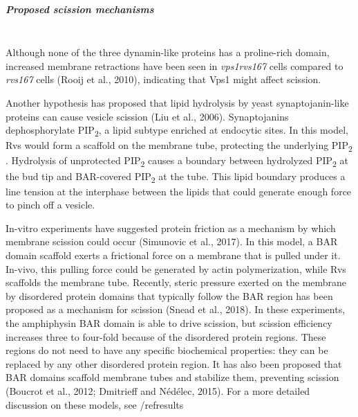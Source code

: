 
		
			\subparagraph{Proposed scission mechanisms}
			\mbox{}\\
			Although none of the three dynamin-like proteins has a proline-rich domain, increased membrane retractions have been seen in \textit{vps1\textDelta}\textit{rvs167\textDelta}  cells compared to \textit{rvs167\textDelta}  cells (Rooij et al., 2010), indicating that Vps1 might affect scission. 

			\vspace{5mm}
Another hypothesis has proposed that lipid hydrolysis by yeast synaptojanin-like proteins can cause vesicle scission (Liu et al., 2006). Synaptojanins dephosphorylate 	PIP\textsubscript{2}, a lipid subtype enriched at endocytic sites. In this model, Rvs would form a scaffold on the membrane tube, protecting the underlying 	PIP\textsubscript{2} . Hydrolysis of unprotected 	PIP\textsubscript{2} causes a boundary between hydrolyzed 	PIP\textsubscript{2} at the bud tip and BAR-covered 	PIP\textsubscript{2} at the tube. This lipid boundary produces a line tension at the interphase between the lipids that could generate enough force to pinch off a vesicle. 


			\vspace{5mm}
In-vitro experiments have suggested protein friction as a mechanism by which membrane scission could occur (Simunovic et al., 2017). In this model, a BAR domain scaffold exerts a frictional force on a membrane that is pulled under it. In-vivo, this pulling force could be generated by actin polymerization, while Rvs scaffolds the membrane tube. 
Recently, steric pressure exerted on the membrane by disordered protein domains that typically follow the BAR region has been proposed as a mechanism for scission (Snead et al., 2018). In these experiments, the amphiphysin BAR domain is able to drive scission, but scission efficiency increases three to four-fold because of the disordered protein regions. These regions do not need to have any specific biochemical properties: they can be replaced by any other disordered protein region. It has also been proposed that BAR domains scaffold membrane tubes and stabilize them, preventing scission (Boucrot et al., 2012; Dmitrieff and Nédélec, 2015). For a more detailed discussion on these models, see /ref{results}

